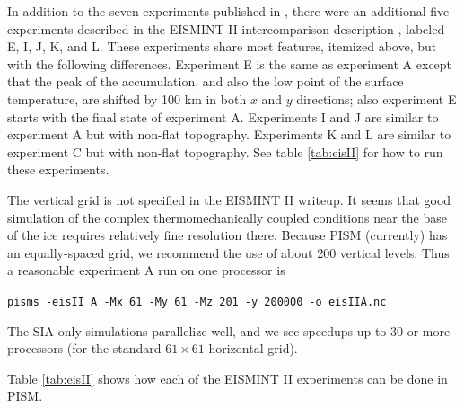 \documentclass[11pt,final]{amsart}
\begin{document}
In addition to the seven experiments published in \cite{EISMINT00}, there were an additional five experiments described in the EISMINT II intercomparison description 
\cite{EISIIdescribe}, labeled E, I, J, K, and L.  These experiments share most features, itemized above, but with the following differences.  Experiment E is the same as experiment A except that the peak of the accumulation, and also the low point of the surface temperature, are shifted by 100 km in both $x$ and $y$ directions; also experiment E starts with the final state of experiment A.  Experiments I and J are similar to experiment A but with non-flat topography.  Experiments K and L are similar to experiment C but with non-flat topography.  See table \ref{tab:eisII} for how to run these experiments.

The vertical grid is not specified in the EISMINT II writeup.  It seems that good simulation of the complex thermomechanically coupled conditions near the base of the ice requires relatively fine resolution there.  Because PISM (currently) has an equally-spaced grid, we recommend the use of about 200 vertical levels.  Thus a reasonable experiment A run on one processor is

\verb|pisms -eisII A -Mx 61 -My 61 -Mz 201 -y 200000 -o eisIIA.nc|

\noindent The SIA-only simulations parallelize well, and we see speedups up to 30 or more processors (for the standard $61\times 61$ horizontal grid).

Table \ref{tab:eisII} shows how each of the EISMINT II experiments can be done in PISM.
\end{document}
